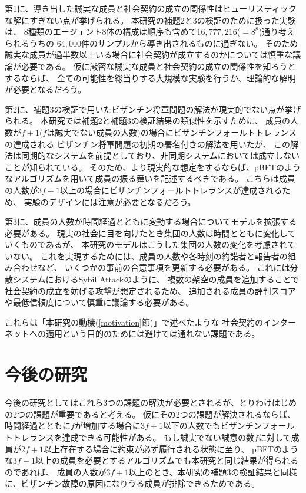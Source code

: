 第1に、導き出した誠実な成員と社会契約の成立の関係性はヒューリスティックな解にすぎない点が挙げられる。
本研究の補題2と3の検証のために扱った実験は、
8種類のエージェント8体の構成は順序も含めて$16,777,216$($=8^8$)通り考えられるうちの
$64,000$件のサンプルから導き出されるものに過ぎない。
そのため誠実な成員が過半数以上いる場合に社会契約が成立するのかについては慎重な議論が必要である。
仮に厳密な誠実な成員と社会契約の成立の関係性を知ろうとするならば、
全ての可能性を総当りする大規模な実験を行うか、理論的な解明が必要となるだろう。

第2に、補題3の検証で用いたビザンチン将軍問題の解法が現実的でない点が挙げられる。
本研究では補題2と補題3の検証結果の類似性を示すために、
成員の人数が$f+1$($f$は誠実でない成員の人数)の場合にビザンチンフォールトトレランスの達成される
ビザンチン将軍問題の初期の署名付きの解法\cite{lamport1982}を用いたが、
この解法は同期的なシステムを前提としており、非同期システムにおいては成立しないことが知られている。\cite{fischer1985}
そのため、より現実的な想定をするならば、pBFTのようなアルゴリズムを用いて成員の振る舞いを記述するべきである。\cite{castro1999}
こちらは成員の人数が$3f+1$以上の場合にビザンチンフォールトトレランスが達成されるため、
実験のデザインには注意が必要となるだろう。

第3に、成員の人数が時間経過とともに変動する場合についてモデルを拡張する必要がある。
現実の社会に目を向けたとき集団の人数は時間とともに変化していくものであるが、
本研究のモデルはこうした集団の人数の変化を考慮されていない。
これを実現するためには、成員の人数や各時刻の約諾者と報告者の組み合わせなど、
いくつかの事前の合意事項を更新する必要がある。
これには分散システムにおけるSybil Attack\cite{douceur2002}のように、
複数の架空の成員を追加することで社会契約の成立を妨げる攻撃が想定されるため、
追加される成員の評判スコアや最低信頼度について慎重に議論する必要がある。

これらは「本研究の動機(\ref{motivation}節)」で述べたような
社会契約のインターネットへの適用という目的のためには避けては通れない課題である。

\section{今後の研究}
今後の研究としてはこれら3つの課題の解決が必要とされるが、とりわけはじめの2つの課題が重要であると考える。
仮にその2つの課題が解決されるならば、
時間経過とともに$f$が増加する場合に$3f+1$以下の人数でもビザンチンフォールトトレランスを達成できる可能性がある。
もし誠実でない誠意の数$f$に対して成員が$2f+1$以上存在する場合に約束が必ず履行される状態に至り、
pBFT\cite{castro1999}のような$3f+1$以上の成員を必要とするアルゴリズムでも本研究と同じ結果が得られるのであれば、
成員の人数が$3f+1$以上のとき、本研究の補題3の検証結果と同様に、ビザンチン故障の原因になりうる成員が排除できるためである。

